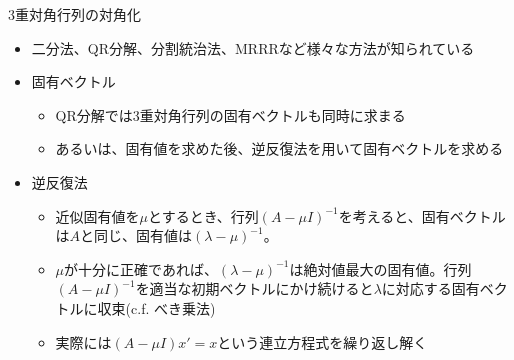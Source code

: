 \begin{frame}[t,fragile]{3重対角行列の対角化}
  \begin{itemize}
  \item 二分法、QR分解、分割統治法、MRRRなど様々な方法が知られている
  \item 固有ベクトル
    \begin{itemize}
    \item QR分解では3重対角行列の固有ベクトルも同時に求まる
    \item あるいは、固有値を求めた後、逆反復法を用いて固有ベクトルを求める
    \end{itemize}
  \item 逆反復法
    \begin{itemize}
    \item 近似固有値を$\mu$とするとき、行列$(A - \mu I)^{-1}$を考えると、固有ベクトルは$A$と同じ、固有値は$(\lambda-\mu)^{-1}$。
    \item $\mu$が十分に正確であれば、$(\lambda-\mu)^{-1}$は絶対値最大の固有値。行列$(A - \mu I)^{-1}$を適当な初期ベクトルにかけ続けると$\lambda$に対応する固有ベクトルに収束(c.f. べき乗法)
    \item 実際には$(A-\mu I) x' = x$という連立方程式を繰り返し解く
    \end{itemize}
  \end{itemize}
\end{frame}
